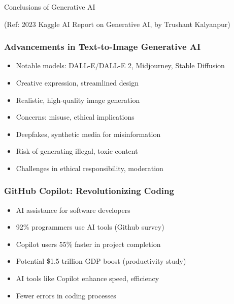 \begin{frame}[fragile]\frametitle{}
\begin{center}
{\Large Conclusions of Generative AI}
\end{center}

{\tiny (Ref: 2023 Kaggle AI Report on Generative AI, by Trushant Kalyanpur)}

\end{frame}

\begin{frame}[fragile]\frametitle{Advancements in Text-to-Image Generative AI}
    \begin{itemize}
        \item Notable models: DALL-E/DALL-E 2, Midjourney, Stable Diffusion
        \item Creative expression, streamlined design
        \item Realistic, high-quality image generation
        \item Concerns: misuse, ethical implications
        \item Deepfakes, synthetic media for misinformation
        \item Risk of generating illegal, toxic content
        \item Challenges in ethical responsibility, moderation
    \end{itemize}
\end{frame}

\begin{frame}[fragile]\frametitle{GitHub Copilot: Revolutionizing Coding}
    \begin{itemize}
        \item AI assistance for software developers
        \item 92\% programmers use AI tools (Github survey)
        \item Copilot users 55\% faster in project completion
        \item Potential \$1.5 trillion GDP boost (productivity study)
        \item AI tools like Copilot enhance speed, efficiency
        \item Fewer errors in coding processes
    \end{itemize}
\end{frame}

